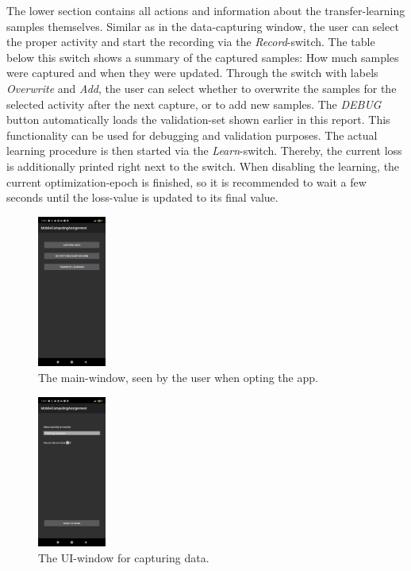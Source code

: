 \documentclass[journal]{IEEEtran}
\begin{document}
\begin{itemize}
    The lower section contains all actions and information about the
    transfer-learning samples themselves. Similar as in the data-capturing
    window, the user can select the proper activity and start the recording
    via the \textit{Record}-switch.\newline
    The table below this switch shows a summary of the captured samples:
    How much samples were captured and when they were updated. Through the
    switch with labels \textit{Overwrite} and \textit{Add}, the user
    can select whether to overwrite the samples for the selected activity
    after the next capture, or to add new samples.\newline
    The \textit{DEBUG} button automatically loads the validation-set shown earlier
    in this report. This functionality can be used for debugging and validation purposes.\newline
    The actual learning procedure is then started via the \textit{Learn}-switch. Thereby, the current
    loss is additionally printed right next to the switch.\newline
    When disabling the learning, the current optimization-epoch is finished, so it is recommended 
    to wait a few seconds until the loss-value is updated to its final value.
    

\end{itemize}
\begin{figure}[htbp]
    \centering
    \includegraphics[width=0.2\textwidth]{figures/UI_main.jpg}
    \caption{The main-window, seen by the user when opting the app.}
    \label{fig:UI_main}
\end{figure}

\begin{figure}[htbp]
    \centering
    \includegraphics[width=0.2\textwidth]{figures/UI_data_capturing.jpg}
    \caption{The UI-window for capturing data.}
    \label{fig:UI_data_capturing}
\end{figure}
\end{document}
